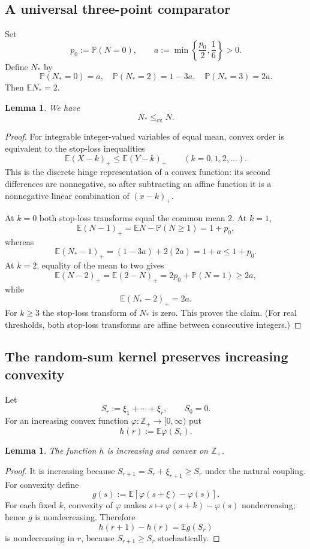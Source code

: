 \documentclass[11pt]{article}
\newtheorem{lemma}[theorem]{Lemma}
\newcommand{\E}{\mathbb E}
\newcommand{\Pp}{\mathbb P}
\newcommand{\cx}{\le_{\mathrm{cx}}}
\begin{document}
\subsection{A universal three-point comparator}

Set
\[
 p_0:=\Pp(N=0),
 \qquad
 a:=\min\left\{\frac{p_0}{2},\frac16\right\}>0.
\]
Define $N_*$ by
\begin{equation}\label{eq:Nstar}
 \Pp(N_*=0)=a,
 \quad
 \Pp(N_*=2)=1-3a,
 \quad
 \Pp(N_*=3)=2a.
\end{equation}
Then $\E N_*=2$.

\begin{lemma}\label{lem:cx}
We have
\[
 N_*\cx N.
\]
\end{lemma}

\begin{proof}
For integrable integer-valued variables of equal mean, convex order is equivalent to the stop-loss inequalities
\[
 \E(X-k)_+\le\E(Y-k)_+\qquad(k=0,1,2,\dots).
\]
This is the discrete hinge representation of a convex function: its second differences are nonnegative, so after subtracting an affine function it is a nonnegative linear combination of $(x-k)_+$.

At $k=0$ both stop-loss transforms equal the common mean $2$.  At $k=1$,
\[
 \E(N-1)_+=\E N-\Pp(N\ge1)=1+p_0,
\]
whereas
\[
 \E(N_*-1)_+=(1-3a)+2(2a)=1+a\le1+p_0.
\]
At $k=2$, equality of the mean to two gives
\[
 \E(N-2)_+=\E(2-N)_+=2p_0+\Pp(N=1)\ge2a,
\]
while
\[
 \E(N_*-2)_+=2a.
\]
For $k\ge3$ the stop-loss transform of $N_*$ is zero.  This proves the claim.  (For real thresholds, both stop-loss transforms are affine between consecutive integers.)
\end{proof}

\subsection{The random-sum kernel preserves increasing convexity}

Let
\[
 S_r:=\xi_1+\cdots+\xi_r,\qquad S_0=0.
\]
For an increasing convex function $\varphi:\mathbb Z_+\to[0,\infty)$ put
\[
 h(r):=\E\varphi(S_r).
\]

\begin{lemma}\label{lem:hconvex}
The function $h$ is increasing and convex on $\mathbb Z_+$.
\end{lemma}

\begin{proof}
It is increasing because $S_{r+1}=S_r+\xi_{r+1}\ge S_r$ under the natural coupling.  For convexity define
\[
 g(s):=\E[\varphi(s+\xi)-\varphi(s)].
\]
For each fixed $k$, convexity of $\varphi$ makes $s\mapsto\varphi(s+k)-\varphi(s)$ nondecreasing; hence $g$ is nondecreasing.  Therefore
\[
 h(r+1)-h(r)=\E g(S_r)
\]
is nondecreasing in $r$, because $S_{r+1}\ge S_r$ stochastically.
\end{proof}
\end{document}

